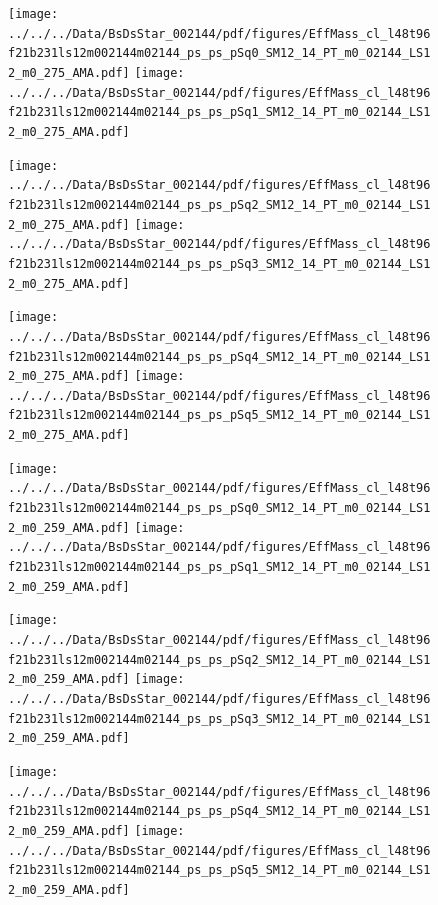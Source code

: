 \documentclass[a4paper,10pt]{article}
\begin{document}
\begin{figure}[p]
 \texttt{[image: ../../../Data/BsDsStar\_002144/pdf/figures/EffMass\_cl\_l48t96f21b231ls12m002144m02144\_ps\_ps\_pSq0\_SM12\_14\_PT\_m0\_02144\_LS12\_m0\_275\_AMA.pdf]} 
 \texttt{[image: ../../../Data/BsDsStar\_002144/pdf/figures/EffMass\_cl\_l48t96f21b231ls12m002144m02144\_ps\_ps\_pSq1\_SM12\_14\_PT\_m0\_02144\_LS12\_m0\_275\_AMA.pdf]} 
 \end{figure}
\begin{figure}[p]
 \texttt{[image: ../../../Data/BsDsStar\_002144/pdf/figures/EffMass\_cl\_l48t96f21b231ls12m002144m02144\_ps\_ps\_pSq2\_SM12\_14\_PT\_m0\_02144\_LS12\_m0\_275\_AMA.pdf]} 
 \texttt{[image: ../../../Data/BsDsStar\_002144/pdf/figures/EffMass\_cl\_l48t96f21b231ls12m002144m02144\_ps\_ps\_pSq3\_SM12\_14\_PT\_m0\_02144\_LS12\_m0\_275\_AMA.pdf]} 
 \end{figure}
\begin{figure}[p]
 \texttt{[image: ../../../Data/BsDsStar\_002144/pdf/figures/EffMass\_cl\_l48t96f21b231ls12m002144m02144\_ps\_ps\_pSq4\_SM12\_14\_PT\_m0\_02144\_LS12\_m0\_275\_AMA.pdf]} 
 \texttt{[image: ../../../Data/BsDsStar\_002144/pdf/figures/EffMass\_cl\_l48t96f21b231ls12m002144m02144\_ps\_ps\_pSq5\_SM12\_14\_PT\_m0\_02144\_LS12\_m0\_275\_AMA.pdf]} 
 \end{figure}
\clearpage
\begin{figure}[p]
 \texttt{[image: ../../../Data/BsDsStar\_002144/pdf/figures/EffMass\_cl\_l48t96f21b231ls12m002144m02144\_ps\_ps\_pSq0\_SM12\_14\_PT\_m0\_02144\_LS12\_m0\_259\_AMA.pdf]} 
 \texttt{[image: ../../../Data/BsDsStar\_002144/pdf/figures/EffMass\_cl\_l48t96f21b231ls12m002144m02144\_ps\_ps\_pSq1\_SM12\_14\_PT\_m0\_02144\_LS12\_m0\_259\_AMA.pdf]} 
 \end{figure}
\begin{figure}[p]
 \texttt{[image: ../../../Data/BsDsStar\_002144/pdf/figures/EffMass\_cl\_l48t96f21b231ls12m002144m02144\_ps\_ps\_pSq2\_SM12\_14\_PT\_m0\_02144\_LS12\_m0\_259\_AMA.pdf]} 
 \texttt{[image: ../../../Data/BsDsStar\_002144/pdf/figures/EffMass\_cl\_l48t96f21b231ls12m002144m02144\_ps\_ps\_pSq3\_SM12\_14\_PT\_m0\_02144\_LS12\_m0\_259\_AMA.pdf]} 
 \end{figure}
\begin{figure}[p]
 \texttt{[image: ../../../Data/BsDsStar\_002144/pdf/figures/EffMass\_cl\_l48t96f21b231ls12m002144m02144\_ps\_ps\_pSq4\_SM12\_14\_PT\_m0\_02144\_LS12\_m0\_259\_AMA.pdf]} 
 \texttt{[image: ../../../Data/BsDsStar\_002144/pdf/figures/EffMass\_cl\_l48t96f21b231ls12m002144m02144\_ps\_ps\_pSq5\_SM12\_14\_PT\_m0\_02144\_LS12\_m0\_259\_AMA.pdf]} 
 \end{figure}
\clearpage
\clearpage
\end{document}
